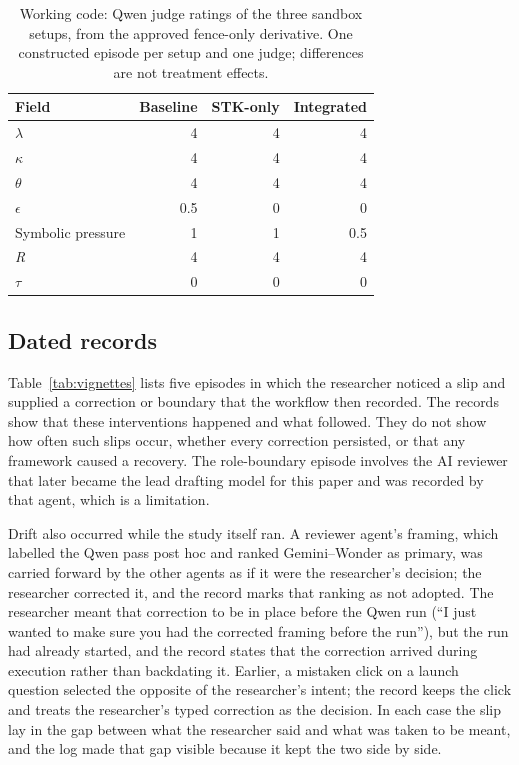 \documentclass[11pt]{article}
\begin{document}
\begin{table}[htbp]
\centering\small
\caption{Working code: Qwen judge ratings of the three sandbox setups, from the approved fence-only derivative. One constructed episode per setup and one judge; differences are not treatment effects.}
\label{tab:stack}
\begin{tabular}{@{}lrrr@{}}
\toprule
Field & Baseline & STK-only & Integrated \\
\midrule
$\lambda$ & 4 & 4 & 4 \\
$\kappa$ & 4 & 4 & 4 \\
$\theta$ & 4 & 4 & 4 \\
$\epsilon$ & 0.5 & 0 & 0 \\
Symbolic pressure & 1 & 1 & 0.5 \\
\textit{R} & 4 & 4 & 4 \\
$\tau$ & 0 & 0 & 0 \\
\bottomrule
\end{tabular}
\end{table}

\subsection{Dated records}
Table~\ref{tab:vignettes} lists five episodes in which the researcher noticed a slip and supplied a correction or boundary that the workflow then recorded. The records show that these interventions happened and what followed. They do not show how often such slips occur, whether every correction persisted, or that any framework caused a recovery. The role-boundary episode involves the AI reviewer that later became the lead drafting model for this paper and was recorded by that agent, which is a limitation.

Drift also occurred while the study itself ran. A reviewer agent's framing, which labelled the Qwen pass post hoc and ranked Gemini--Wonder as primary, was carried forward by the other agents as if it were the researcher's decision; the researcher corrected it, and the record marks that ranking as not adopted. The researcher meant that correction to be in place before the Qwen run (``I just wanted to make sure you had the corrected framing before the run''), but the run had already started, and the record states that the correction arrived during execution rather than backdating it. Earlier, a mistaken click on a launch question selected the opposite of the researcher's intent; the record keeps the click and treats the researcher's typed correction as the decision. In each case the slip lay in the gap between what the researcher said and what was taken to be meant, and the log made that gap visible because it kept the two side by side.
\end{document}
